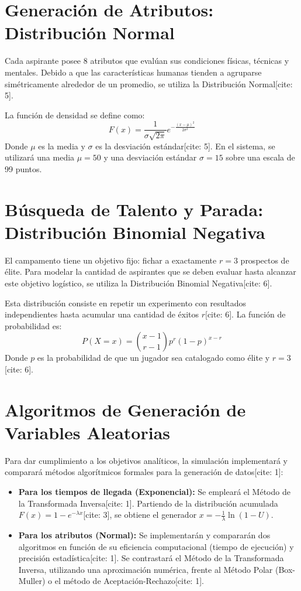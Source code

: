 \documentclass[12pt,a4paper]{article}
\begin{document}
\section{Generación de Atributos: Distribución Normal}
Cada aspirante posee 8 atributos que evalúan sus condiciones físicas, técnicas y mentales. Debido a que las características humanas tienden a agruparse simétricamente alrededor de un promedio, se utiliza la Distribución Normal[cite: 5].

La función de densidad se define como:
\begin{equation}
    F(x) = \frac{1}{\sigma\sqrt{2\pi}}e^{-\frac{(x-\mu)^{2}}{2\sigma^{2}}}
\end{equation}
Donde $\mu$ es la media y $\sigma$ es la desviación estándar[cite: 5]. En el sistema, se utilizará una media $\mu = 50$ y una desviación estándar $\sigma = 15$ sobre una escala de 99 puntos.

\section{Búsqueda de Talento y Parada: Distribución Binomial Negativa}
El campamento tiene un objetivo fijo: fichar a exactamente $r = 3$ prospectos de élite. Para modelar la cantidad de aspirantes que se deben evaluar hasta alcanzar este objetivo logístico, se utiliza la Distribución Binomial Negativa[cite: 6].

Esta distribución consiste en repetir un experimento con resultados independientes hasta acumular una cantidad de éxitos $r$[cite: 6]. La función de probabilidad es:
\begin{equation}
    P(X=x) = \binom{x-1}{r-1} p^{r}(1-p)^{x-r}
\end{equation}
Donde $p$ es la probabilidad de que un jugador sea catalogado como élite y $r=3$[cite: 6]. 

\section{Algoritmos de Generación de Variables Aleatorias}
Para dar cumplimiento a los objetivos analíticos, la simulación implementará y comparará métodos algorítmicos formales para la generación de datos[cite: 1]:

\begin{itemize}
    \item \textbf{Para los tiempos de llegada (Exponencial):} Se empleará el Método de la Transformada Inversa[cite: 1]. Partiendo de la distribución acumulada $F(x) = 1 - e^{-\lambda x}$[cite: 3], se obtiene el generador $x = -\frac{1}{\lambda}\ln(1-U)$.
    \item \textbf{Para los atributos (Normal):} Se implementarán y compararán dos algoritmos en función de su eficiencia computacional (tiempo de ejecución) y precisión estadística[cite: 1]. Se contrastará el Método de la Transformada Inversa, utilizando una aproximación numérica, frente al Método Polar (Box-Muller) o el método de Aceptación-Rechazo[cite: 1].
\end{itemize}
\end{document}
